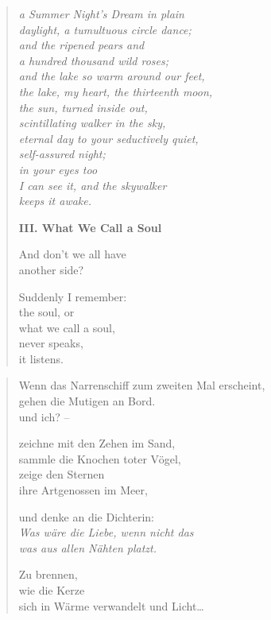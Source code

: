 \clearpage

\begin{verse}
{\itshape
a {\upshape Summer Night's Dream} in plain\label{summer-nights}\\
daylight, a tumultuous circle dance;\\
and the ripened pears and\\
a hundred thousand wild roses;\\
and the lake so warm around our feet,\\
the lake, my heart, the thirteenth moon,\\
the sun, turned inside out,\\
scintillating walker in the sky,\\
eternal day to your seductively quiet,\\
self-assured night;\\
in your eyes too\\
I can see it, and the skywalker\\
keeps it awake.}

\vspace*{\onelineskip}
{\bfseries III. What We Call a Soul}

And don't we all have\\
another side?

Suddenly I remember:\\
the soul, or\\
what we call a soul,\\
never speaks,\\
it listens.
\end{verse}

\clearpage

\begin{verse}
Wenn das Narrenschiff zum zweiten Mal erscheint,\\
gehen die Mutigen an Bord.\\
und ich? --

zeichne mit den Zehen im Sand,\\
sammle die Knochen toter Vögel,\\
zeige den Sternen\\
ihre Artgenossen im Meer,

und denke an die Dichterin:\\
{\itshape Was wäre die Liebe, wenn nicht das\\
was aus allen Nähten platzt.}

Zu brennen,\\
wie die Kerze\\
sich in Wärme verwandelt und Licht\ldots
\end{verse}

